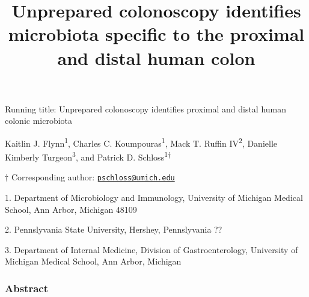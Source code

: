 \documentclass[11pt,]{article}
\title{Unprepared colonoscopy identifies microbiota specific to the proximal
and distal human colon}
\author{}
\date{}
\begin{document}
\maketitle

\vspace{35mm}

Running title: Unprepared colonoscopy identifies proximal and distal
human colonic microbiota

\vspace{35mm}

Kaitlin J. Flynn\textsuperscript{1}, Charles C.
Koumpouras\textsuperscript{1}, Mack T. Ruffin IV\textsuperscript{2},
Danielle Kimberly Turgeon\textsuperscript{3}, and Patrick D.
Schloss\textsuperscript{1\(\dagger\)}

\vspace{35mm}

\(\dagger\) Corresponding author:
\href{mailto:pschloss@umich.edu}{\nolinkurl{pschloss@umich.edu}}

1. Department of Microbiology and Immunology, University of Michigan
Medical School, Ann Arbor, Michigan 48109

2. Pennslyvania State University, Hershey, Pennslyvania ??

3. Department of Internal Medicine, Division of Gastroenterology,
University of Michigan Medical School, Ann Arbor, Michigan

\newpage

\subsubsection{Abstract}\label{abstract}
\end{document}
